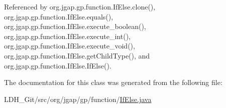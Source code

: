 Referenced by org.\-jgap.\-gp.\-function.\-If\-Else.\-clone(), org.\-jgap.\-gp.\-function.\-If\-Else.\-equals(), org.\-jgap.\-gp.\-function.\-If\-Else.\-execute\-\_\-boolean(), org.\-jgap.\-gp.\-function.\-If\-Else.\-execute\-\_\-int(), org.\-jgap.\-gp.\-function.\-If\-Else.\-execute\-\_\-void(), org.\-jgap.\-gp.\-function.\-If\-Else.\-get\-Child\-Type(), and org.\-jgap.\-gp.\-function.\-If\-Else.\-If\-Else().



The documentation for this class was generated from the following file\-:\begin{DoxyCompactItemize}
\item 
L\-D\-H\-\_\-\-Git/src/org/jgap/gp/function/\hyperlink{_if_else_8java}{If\-Else.\-java}\end{DoxyCompactItemize}
